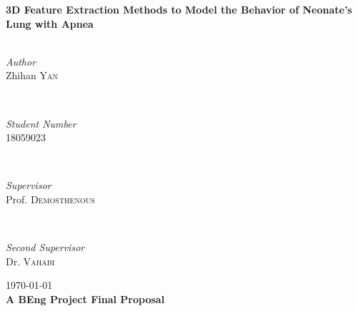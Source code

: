 \begin{titlepage}
	{\huge\bfseries 3D Feature Extraction Methods to Model the Behavior of Neonate’s Lung with Apnea}\\[0.4cm] %
	
	\HRule\\[1.5cm]
	
	
	\begin{minipage}{0.4\textwidth}
		\begin{flushleft}
			\large
			\textit{Author}\\
			Zhihan \textsc{Yan} %
		\end{flushleft}
		  \hfill		
	\end{minipage}
         ~
	\begin{minipage}{0.4\textwidth}
		\begin{flushright}
			\large
			\textit{Student Number}\\
			 \textsc{18059023} %
		\end{flushright}
	\end{minipage}
	~
	\begin{minipage}{0.4\textwidth}
		\begin{flushleft}
			\large
			\textit{Supervisor}\\
			Prof. \textsc{Demosthenous} %
		\end{flushleft}
	\end{minipage}
	~
	\begin{minipage}{0.4\textwidth}
		\begin{flushright}
			\large
			\textit{Second Supervisor}\\
			Dr.  \textsc{Vahabi} %
		\end{flushright}
	\end{minipage}
	
	
	\vfill\vfill\vfill %
	
	{\large\today} \\%
	{\large \textbf{A BEng Project Final Proposal}}
	
	 
	
	\vfill %
	
\end{titlepage}

